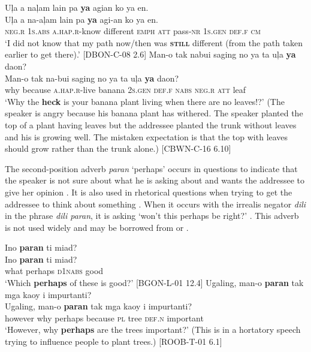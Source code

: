 \z
\ea
Uļa  a  naļam  lain  pa  \textbf{ya}  agian  ko  ya en. \\\smallskip
 \gll Uļa  a  na-aļam  lain  pa  \textbf{ya}  agi-an  ko  ya en. \\
     \textsc{neg.r}  1\textsc{s.abs}  \textsc{a.hap.r}-know  different  \textsc{emph}  \textsc{att}  pass-\textsc{nr}  1\textsc{s.gen}  \textsc{def.f} \textsc{cm} \\
\glt ‘I did not know that my path now/then was \textbf{\textsc{still}} different (from the path taken earlier to get there).’ [DBON-C-08 2.6]
\z
\ea
\label{bkm:Ref441519766}\label{bkm:Ref52607980}
Man-o  tak  nabui  saging  no  ya  ta  uļa  \textbf{ya}  daon? \\\smallskip
 \gll Man-o  tak  na-bui  saging  no  ya  ta  uļa  \textbf{ya}  daon? \\
why  because  \textsc{a.hap.r}-live  banana  2\textsc{s.gen}  \textsc{def.f}  \textsc{nabs}  \textsc{neg.r}  \textsc{att}  leaf \\
\glt ‘Why the \textbf{heck} is your banana plant living when there are no leaves!?’ (The speaker is angry because his banana plant has withered. The speaker planted the top of a plant having leaves but the addressee planted the trunk without leaves and his is growing well. The mistaken expectation is that the top with leaves should grow rather than the trunk alone.) [CBWN-C-16 6.10]
\z

The second-position adverb \textit{paran} ‘perhaps’ occurs in questions to indicate that the speaker is not sure about what he is asking about and wants the addressee to give her opinion . It is also used in rhetorical questions when trying to get the addressee to think about something .  When it occurs with the irrealis negator \textit{dili} in the phrase \textit{dili paran}, it is asking ‘won’t this perhaps be right?’ . This adverb is not used widely and may be borrowed from  or .

\ea
\label{bkm:Ref441522128}
Ino  \textbf{paran}  ti  miad? \\\smallskip
 \gll Ino  \textbf{paran}  ti  miad? \\
what  perhaps  \textsc{d}1\textsc{nabs}  good \\
\glt ‘Which \textbf{perhaps} of these is good?' [BGON-L-01 12.4]
\z
\ea
\label{bkm:Ref441522154}
Ugaling,  man-o  \textbf{paran}  tak  mga  kaoy  i  impurtanti? \\\smallskip
 \gll Ugaling,  man-o  \textbf{paran}  tak  mga  kaoy  i  impurtanti? \\
however  why  perhaps  because  \textsc{pl}  tree  \textsc{def.n}  important \\
\glt ‘However, why \textbf{perhaps} are the trees important?’ (This is in a hortatory speech trying to influence people to plant trees.) [ROOB-T-01 6.1]
\z


